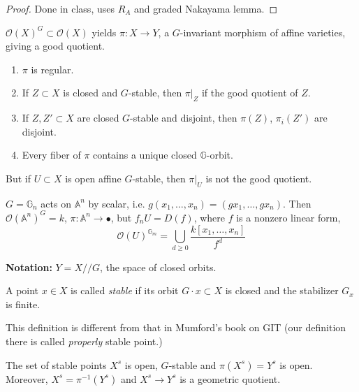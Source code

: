 \begin{proof}
Done in class, uses $R_A$ and graded Nakayama lemma.
\end{proof}

\medskip\noindent	
$\mathcal{O}(X)^G \subset \mathcal{O}(X)$ yields $\pi:X\to Y$, a $G$-invariant
morphism of affine varieties, giving a good quotient.

\begin{proposition}
\label{proposition-projection}
\begin{enumerate}
\item $\pi$ is regular.
\item If  $Z \subset X$ is closed and $G$-stable, then $\pi|_{Z}$ if the good
quotient of $Z$.
\item If $Z,Z'\subset X$ are closed $G$-stable and disjoint, then $\pi(Z)$,
$\pi_i(Z')$ are disjoint.
\item Every fiber of $\pi$ contains a unique closed $\mathbb{G}$-orbit.
\end{enumerate}
But if $U\subset X$ is open affine $G$-stable, then $\pi|_{U}$ is not the good
quotient.
\end{proposition}

\begin{example}
\label{example-Hopf-surface?}
$G=\mathbb{G}_n$ acts on $\mathbb{A}^n$ by scalar, i.e. 
$g(x_1,\ldots,x_n)=(gx_1,\ldots,gx_n)$. Then $\mathcal{O}(\mathbb{A}^n)^G=k$,
$\pi:\mathbb{A}^n \to \bullet$,
but $f_nU=D(f)$, where $f$ is a nonzero linear form,
$$
\mathcal{O}(U)^{\mathbb{G}_m}=\bigcup_{d \geq 0}\frac{k[x_1,\ldots,x_n]}{f^d}
$$
\end{example}

{\bf Notation:} $Y=X//G$, the space of closed orbits.

\begin{definition}
\label{definition-stable-point}
A point $x \in X$ is called {\it stable} if its orbit $G\cdot x \subset X$ is
closed and the stabilizer  $G_x$ is finite.
\end{definition}

This definition is different from that in Mumford's book on GIT (our definition
there is called {\it properly} stable point.)

\begin{proposition}
\label{proposition-stable-points}
The set of stable points $X^s$ is open, $G$-stable and $\pi(X^s)=Y^s$ is open.
Moreover, $X^s=\pi^{-1}(Y^s)$ and $X^s \to Y^s$ is a geometric quotient.
\end{proposition}

